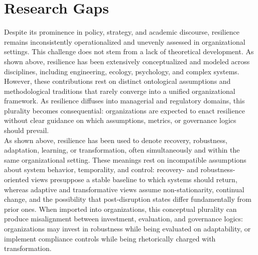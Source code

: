 \section{Research Gaps}
\label{sec:RG}

Despite its prominence in policy, strategy, and academic discourse, resilience remains inconsistently operationalized and unevenly assessed in organizational settings. This challenge does not stem from a lack of theoretical development. As shown above, resilience has been extensively conceptualized and modeled across disciplines, including engineering, ecology, psychology, and complex systems. However, these contributions rest on distinct ontological assumptions and methodological traditions that rarely converge into a unified organizational framework. As resilience diffuses into managerial and regulatory domains, this plurality becomes consequential: organizations are expected to enact resilience without clear guidance on which assumptions, metrics, or governance logics should prevail.\\

As shown above, resilience has been used to denote recovery, robustness, adaptation, learning, or transformation, often simultaneously and within the same organizational setting. These meanings rest on incompatible assumptions about system behavior, temporality, and control: recovery- and robustness-oriented views presuppose a stable baseline to which systems should return, whereas adaptive and transformative views assume non-stationarity, continual change, and the possibility that post-disruption states differ fundamentally from prior ones. When imported into organizations, this conceptual plurality can produce misalignment between investment, evaluation, and governance logics: organizations may invest in robustness while being evaluated on adaptability, or implement compliance controls while being rhetorically charged with transformation.\\

